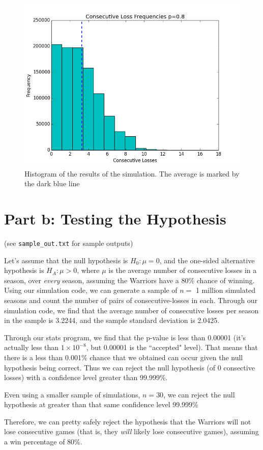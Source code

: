 \documentclass[12pt]{article}
\theoremstyle{nonumberplain}
\begin{document}
\begin{figure}
  \includegraphics[width=\linewidth]{figure_1.png}
  \caption{Histogram of the results of the simulation. The average is marked by the dark blue line}
  \label{fig:boat1}
\end{figure}


\section{Part b: Testing the Hypothesis}
(see \lstinline|sample_out.txt| for sample outputs)

Let's assume that the null hypothesis is $H_0: \mu = 0$, and the one-sided alternative hypothesis is $H_A: \mu > 0$, where $\mu$ is the average number of consecutive losses in a season, over \textit{every} season, assuming the Warriors have a 80\% chance of winning. Using our simulation code, we can generate a sample of $n=$ 1 million simulated seasons and count the number of pairs of consecutive-losses in each. Through our simulation code, we find that the average number of consecutive losses per season in the sample is 3.2244, and the sample standard deviation is 2.0425. 

Through our stats program, we find that the p-value is less than 0.00001 (it's actually less than $1\times 10^{-8}$, but 0.00001 is the ``accepted" level). That means that there is a less than 0.001\% chance that we obtained can occur given the null hypothesis being correct. Thus we can reject the null hypothesis (of 0 consective losses) with a confidence level greater than 99.999\%.

Even using a smaller sample of simulations, $n=30$, we can reject the null hypothesis at greater than that same confidence level 99.999\%

Therefore, we can pretty safely reject the hypothesis that the Warriors will not lose consecutive games (that is, they \textit{will} likely lose consecutive games), assuming a win percentage of 80\%.
\end{document}
